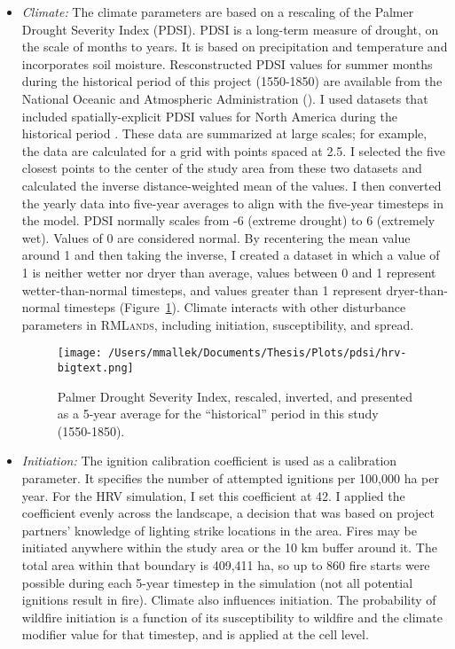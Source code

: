 \begin{itemize}
\item \emph{Climate:} The climate parameters are based on a rescaling of the Palmer Drought Severity Index (PDSI). PDSI is a long-term measure of drought, on the scale of months to years. It is based on precipitation and temperature and incorporates soil moisture. Resconstructed PDSI values for summer months during the historical period of this project (1550-1850) are available from the National Oceanic and Atmospheric Administration (). I used datasets that included spatially-explicit PDSI values for North America during the historical period \citep{Cooketal2004,Cook2004,Zhang2004,Zhangetal.2004}. These data are summarized at large scales; for example, the \citet{Cook2004} data are calculated for a grid with points spaced at 2.5\textdegree. I selected the five closest points to the center of the study area from these two datasets and calculated the inverse distance-weighted mean of the values. I then converted the yearly data into five-year averages to align with the five-year timesteps in the model. PDSI normally scales from -6 (extreme drought) to 6 (extremely wet). Values of 0 are considered normal. By recentering the mean value around 1 and then taking the inverse, I created a dataset in which a value of 1 is neither wetter nor dryer than average, values between 0 and 1 represent wetter-than-normal timesteps, and values greater than 1 represent dryer-than-normal timesteps (Figure~\ref{pdsi}). Climate interacts with other disturbance parameters in \textsc{RMLands}, including initiation, susceptibility, and spread.


\begin{figure}[htbp]
\centering
\texttt{[image: /Users/mmallek/Documents/Thesis/Plots/pdsi/hrv-bigtext.png]}
\caption{Palmer Drought Severity Index, rescaled, inverted, and presented as a 5-year average for the ``historical'' period in this study (1550-1850).} 
\label{pdsi}
\end{figure}


\item \emph{Initiation:} The ignition calibration coefficient is  used as a calibration parameter. It specifies the number of attempted ignitions per 100,000 ha per year. For the HRV simulation, I set this coefficient at 42. I applied the coefficient evenly across the landscape, a decision that was based on project partners' knowledge of lighting strike locations in the area. Fires may be initiated anywhere within the study area or the 10 km buffer around it. The total area within that boundary is 409,411 ha, so up to 860 fire starts were possible during each 5-year timestep in the simulation (not all potential ignitions result in fire). Climate also influences initiation. The probability of wildfire initiation is a function of its susceptibility to wildfire and the climate modifier value for that timestep, and is applied at the cell level.


\end{itemize}
